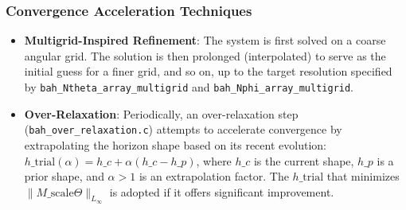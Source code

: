 \documentclass[a4paper,11pt]{article}
\begin{document}
\subsubsection{Convergence Acceleration Techniques}
\begin{itemize}
    \item \textbf{Multigrid-Inspired Refinement}: The system is first solved on a coarse angular grid. The solution is then prolonged (interpolated) to serve as the initial guess for a finer grid, and so on, up to the target resolution specified by \texttt{bah\_Ntheta\_array\_multigrid} and \texttt{bah\_Nphi\_array\_multigrid}.
    \item \textbf{Over-Relaxation}: Periodically, an over-relaxation step (\texttt{bah\_over\_relaxation.c}) attempts to accelerate convergence by extrapolating the horizon shape based on its recent evolution: $h\_{\text{trial}}(\alpha) = h\_c + \alpha(h\_c - h\_p)$, where $h\_c$ is the current shape, $h\_p$ is a prior shape, and $\alpha > 1$ is an extrapolation factor. The $h\_{\text{trial}}$ that minimizes $\|M\_{\text{scale}}\Theta\|_{L_\infty}$ is adopted if it offers significant improvement.
\end{itemize}
\end{document}
